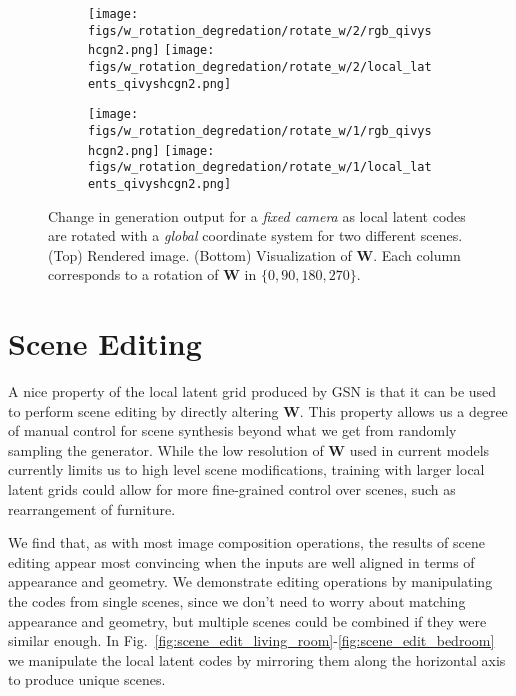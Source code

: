 \documentclass[10pt,twocolumn,letterpaper]{article}
\begin{document}
\begin{figure*}[h]
	\centering
	\begin{subfigure}{0.49\linewidth}
		\centering
		\texttt{[image: figs/w\_rotation\_degredation/rotate\_w/2/rgb\_qivyshcgn2.png]}
		\texttt{[image: figs/w\_rotation\_degredation/rotate\_w/2/local\_latents\_qivyshcgn2.png]}
	\end{subfigure} \hfill
	\begin{subfigure}{0.49\linewidth}
		\centering
		\texttt{[image: figs/w\_rotation\_degredation/rotate\_w/1/rgb\_qivyshcgn2.png]}
		\texttt{[image: figs/w\_rotation\_degredation/rotate\_w/1/local\_latents\_qivyshcgn2.png]}
	\end{subfigure}
	\caption{Change in generation output for a \textit{fixed camera} as local latent codes are rotated with a \textit{global} coordinate system for two different scenes. (Top) Rendered image. (Bottom) Visualization of $\textbf{W}$. Each column corresponds to a rotation of $\textbf{W}$ in $\{0, 90, 180, 270\}$.}
	\label{fig:rotate_W_global}
\end{figure*}

\section{Scene Editing} 

A nice property of the local latent grid produced by GSN is that it can be used to perform scene editing by directly altering $\textbf{W}$. This property allows us a degree of manual control for scene synthesis beyond what we get from randomly sampling the generator. While the low resolution of $\textbf{W}$ used in current models currently limits us to high level scene modifications, training with larger local latent grids could allow for more fine-grained control over scenes, such as rearrangement of furniture. 

We find that, as with most image composition operations, the results of scene editing appear most convincing when the inputs are well aligned in terms of appearance and geometry. We demonstrate editing operations by manipulating the codes from single scenes, since we don't need to worry about matching appearance and geometry, but multiple scenes could be combined if they were similar enough.
In Fig.~\ref{fig:scene_edit_living_room}-\ref{fig:scene_edit_bedroom} we manipulate the local latent codes by mirroring them along the horizontal axis to produce unique scenes.
\end{document}
